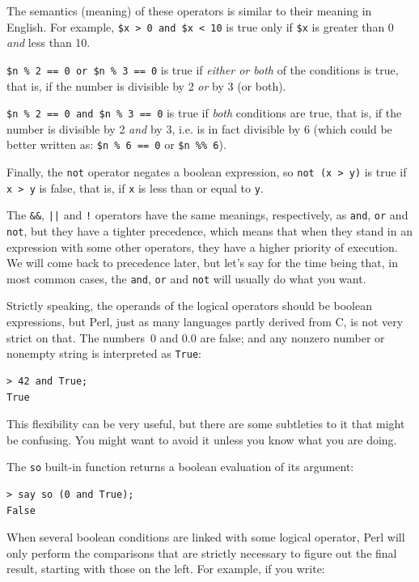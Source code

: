 The semantics (meaning) of these operators is
similar to their meaning in English.  For example,
{\tt \$x > 0 and \$x < 10} is true only if {\tt \$x} is greater 
than 0 {\em and} less than 10.

{\tt \$n \% 2 == 0 or \$n \% 3 == 0} is true if {\em either or 
both} of the conditions is true, that is, if the number is 
divisible by 2 {\em or} by 3 (or both).

{\tt \$n \% 2 == 0 and \$n \% 3 == 0} is true if {\em both} 
conditions are true, that is, if the number is divisible by 2
{\em and} by 3, i.e. is in fact divisible by 6 (which could be better 
written as: {\tt \$n \% 6 == 0} or {\tt \$n \%\% 6}).


Finally, the {\tt not} operator negates a boolean
expression, so {\tt not (x > y)} is true if {\tt x > y} 
is false, that is, if {\tt x} is less than or equal 
to {\tt y}.

The {\tt \&\&}, {\tt ||} and {\tt !} operators have the same meanings, respectively, as {\tt and}, {\tt or} and {\tt not}, but they have a tighter precedence, which means that when they stand in an expression with some other operators, they have a higher priority of execution. We will come back to precedence later, but let's say for the time being that, in most common cases, the {\tt and}, {\tt or} and {\tt not} will usually do what you want.

Strictly speaking, the operands of the logical operators should 
be boolean expressions, but Perl, just as many languages 
partly derived from C, is not very strict on that. The 
numbers~0 and 0.0 are false; and any nonzero number or nonempty string is interpreted as {\tt True}:

\begin{verbatim}
> 42 and True;
True
\end{verbatim}
%
This flexibility can be very useful, but there are some 
subtleties to it that might be confusing.  You might want 
to avoid it unless you know what you are doing.

The {\tt so} built-in function returns a boolean evaluation of 
its argument:

\begin{verbatim}
> say so (0 and True);
False
\end{verbatim}
%

When several boolean conditions are linked with some logical 
operator, Perl will only perform the comparisons that are strictly necessary to figure out the final result, starting with those on the left. For example, if you write:

